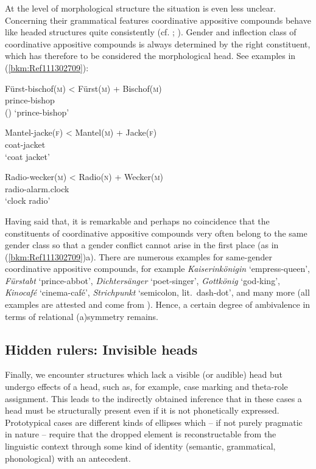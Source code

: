 \documentclass[output=paper
  ,nobabel
  ,draftmode
  ,colorlinks, citecolor=brown
]{langscibook}
\begin{document}
At the level of morphological structure the situation is even less unclear. Concerning their
grammatical features coordinative appositive compounds behave like headed structures quite
consistently (cf. \citealt[143]{Olsen1990b}; \citealt[369]{Olsen2015b}). Gender and inflection class
of  coordinative appositive compounds is always determined by the right constituent, which has
therefore to be considered the morphological head. See  examples in (\ref{bkm:Ref111302709}):

\eal

\label{bkm:Ref111302709}
\ex 
\gll Fürst-bischof\textsc{(m)}  <  Fürst\textsc{(m)} + Bischof\textsc{(m)}\\
       prince-bishop\\\hfill()
\glt   `prince-bishop'

\ex
\gll Mantel-jacke\textsc{(f)}  <  Mantel\textsc{(m)} + Jacke\textsc{(f)}\\
       coat-jacket \\
\glt   `coat jacket'

\ex
\gll Radio-wecker\textsc{(m)}  <  Radio\textsc{(n)} + Wecker\textsc{(m)}\\
       radio-alarm.clock \\
\glt   `clock radio'
\zl

\largerpage
\noindent
Having said that, it is remarkable and perhaps no coincidence that the constituents of coordinative
appositive compounds very often belong to the same gender class so that a gender conflict cannot
arise in the first place (as in (\ref{bkm:Ref111302709})a). There are numerous examples for
same-gender coordinative appositive compounds, for example \emph{Kaiserinkönigin} `empress-queen',
\emph{Fürstabt} `prince-abbot', \emph{Dichtersänger} `poet-singer', \emph{Gottkönig} `god-king',
\emph{Kinocafé} `cinema-café', \emph{Strichpunkt} `semicolon, lit.\ dash-dot', and many more (all
examples are attested and come from \citealt[34]{BreindlThurmair1992}). Hence, a certain degree of
ambivalence in terms of relational (a)symmetry remains.

\subsection{Hidden rulers: Invisible heads}

Finally, we encounter structures which lack a visible (or audible) head but undergo effects of a
head, such as, for example, case marking and theta-role assignment. This leads to the indirectly
obtained inference that in these cases a head must be structurally present even if it is not
phonetically expressed. Prototypical cases are different kinds of ellipses which – if not purely
pragmatic in nature – require that the dropped element is reconstructable from the linguistic
context through some kind of identity (semantic, grammatical, phonological) with an antecedent.
\end{document}
